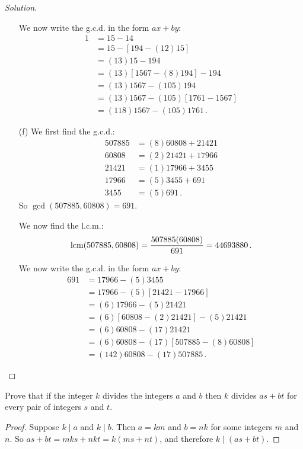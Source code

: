 \begin{proof}[Solution]
\begin{enumerate}
			We now write the g.c.d. in the form $ax + by$:
			\begin{align*}
				1 &= 15 - 14 \\
					&= 15 - [194 - (12)15] \\
					&= (13)15 - 194 \\
					&= (13)[1567 - (8)194] - 194 \\
					&= (13)1567 - (105)194 \\
					&= (13)1567 - (105)[1761 - 1567] \\
					&= (118)1567 - (105)1761\,.
			\end{align*}
		\item[(f)] We first find the g.c.d.:
			\begin{align*}
				507885 &= (8)60808 + 21421 \\
				60808 &= (2)21421 + 17966 \\
				21421 &= (1)17966 + 3455 \\
				17966 &= (5)3455 + 691 \\
				3455 &= (5)691\,.
			\end{align*}
			So $\gcd(507885,60808) = 691$.
			
			We now find the l.c.m.:
			\[
				\operatorname{lcm}(507885,60808) = \frac{507885(60808)}{691} = 44693880\,.
			\]
			
			We now write the g.c.d. in the form $ax + by$:
			\begin{align*}
				691 &= 17966 - (5)3455 \\
					&= 17966 - (5)[21421 - 17966] \\
					&= (6)17966 - (5)21421 \\
					&= (6)[60808 - (2)21421] - (5)21421 \\
					&= (6)60808 - (17)21421 \\
					&= (6)60808 - (17)[507885 - (8)60808] \\
					&= (142)60808 - (17)507885\,.
			\end{align*}
	\end{enumerate}
\end{proof}


\begin{exercise}
	Prove that if the integer $k$ divides the integers $a$ and $b$ then $k$ divides $as + bt$ for every pair of integers $s$ and $t$.
\end{exercise}

\begin{proof}
	Suppose $k \mid a$ and $k \mid b$. Then $a = km$ and $b = nk$ for some integers $m$ and $n$. So $as + bt = mks + nkt = k(ms + nt)$, and therefore $k \mid (as + bt)$.
\end{proof}

